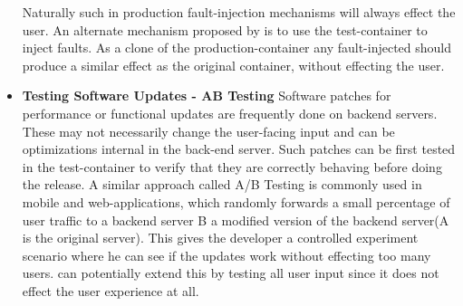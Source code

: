 \begin{itemize}
Naturally such in production fault-injection mechanisms will always effect the user. 
An alternate mechanism proposed by \parikshan is to use the test-container to inject faults. 
As a clone of the production-container any fault-injected should produce a similar effect as the original container, without effecting the user.

  \item \textbf{Testing Software Updates - AB Testing}
Software patches for performance or functional updates are frequently done on backend servers. 
These may not necessarily change the user-facing input and can be optimizations internal in the back-end server.
Such patches can be first tested in the test-container to verify that they are correctly behaving before doing the release.
A similar approach called A/B Testing\cite{abtesting} is commonly used in mobile and web-applications, which randomly forwards a small percentage of user traffic to a backend server B  a modified version of the backend server(A is the original server). 
This gives the developer a controlled experiment scenario where he can see if the updates work without effecting too many users.
\parikshan can potentially extend this by testing all user input since it does not effect the user experience at all.


\end{itemize}
